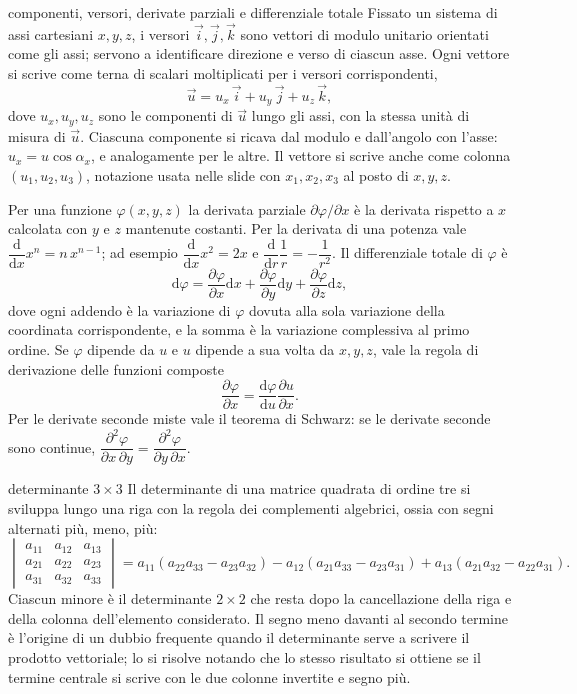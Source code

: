 \documentclass[11pt,a4paper]{article}
\newcommand{\dd}{\mathrm{d}}
\begin{document}
\begin{richiamo}{componenti, versori, derivate parziali e differenziale totale}
Fissato un sistema di assi cartesiani $x,y,z$, i versori $\vec i,\vec j,\vec k$ sono vettori di modulo unitario orientati come gli assi; servono a identificare direzione e verso di ciascun asse. Ogni vettore si scrive come terna di scalari moltiplicati per i versori corrispondenti,
\[
\vec u = u_x\,\vec i + u_y\,\vec j + u_z\,\vec k ,
\]
dove $u_x,u_y,u_z$ sono le componenti di $\vec u$ lungo gli assi, con la stessa unità di misura di $\vec u$. Ciascuna componente si ricava dal modulo e dall'angolo con l'asse: $u_x=u\cos\alpha_x$, e analogamente per le altre. Il vettore si scrive anche come colonna $(u_1,u_2,u_3)$, notazione usata nelle slide con $x_1,x_2,x_3$ al posto di $x,y,z$.

Per una funzione $\varphi(x,y,z)$ la derivata parziale $\partial\varphi/\partial x$ è la derivata rispetto a $x$ calcolata con $y$ e $z$ mantenute costanti. Per la derivata di una potenza vale $\dfrac{\dd}{\dd x}x^n=n\,x^{n-1}$; ad esempio $\dfrac{\dd}{\dd x}x^2=2x$ e $\dfrac{\dd}{\dd r}\dfrac1r=-\dfrac1{r^2}$. Il differenziale totale di $\varphi$ è
\[
\dd\varphi=\frac{\partial\varphi}{\partial x}\dd x+\frac{\partial\varphi}{\partial y}\dd y+\frac{\partial\varphi}{\partial z}\dd z ,
\]
dove ogni addendo è la variazione di $\varphi$ dovuta alla sola variazione della coordinata corrispondente, e la somma è la variazione complessiva al primo ordine. Se $\varphi$ dipende da $u$ e $u$ dipende a sua volta da $x,y,z$, vale la regola di derivazione delle funzioni composte
\[
\frac{\partial\varphi}{\partial x}=\frac{\dd\varphi}{\dd u}\frac{\partial u}{\partial x}.
\]
Per le derivate seconde miste vale il teorema di Schwarz: se le derivate seconde sono continue, $\dfrac{\partial^2\varphi}{\partial x\,\partial y}=\dfrac{\partial^2\varphi}{\partial y\,\partial x}$.
\end{richiamo}

\begin{richiamo}{determinante $3\times3$}
Il determinante di una matrice quadrata di ordine tre si sviluppa lungo una riga con la regola dei complementi algebrici, ossia con segni alternati più, meno, più:
\[
\begin{vmatrix} a_{11}&a_{12}&a_{13}\\ a_{21}&a_{22}&a_{23}\\ a_{31}&a_{32}&a_{33}\end{vmatrix}
=a_{11}(a_{22}a_{33}-a_{23}a_{32})-a_{12}(a_{21}a_{33}-a_{23}a_{31})+a_{13}(a_{21}a_{32}-a_{22}a_{31}).
\]
Ciascun minore è il determinante $2\times2$ che resta dopo la cancellazione della riga e della colonna dell'elemento considerato. Il segno meno davanti al secondo termine è l'origine di un dubbio frequente quando il determinante serve a scrivere il prodotto vettoriale; lo si risolve notando che lo stesso risultato si ottiene se il termine centrale si scrive con le due colonne invertite e segno più.
\end{richiamo}
\end{document}
